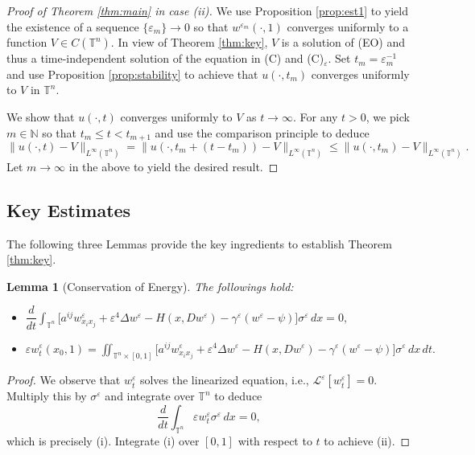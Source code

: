 \documentclass[12pt,reqno]{amsart}
\theoremstyle{plain}
\newtheorem{lem}[thm]{Lemma}
\theoremstyle{remark}
\numberwithin{equation}{section}
\begin{document}
\begin{proof}[Proof of Theorem {\rm\ref{thm:main}} in case {\rm(ii)}]
We use Proposition \ref{prop:est1} to yield the existence of a sequence $\{{\varepsilon}_m\} \to 0$ so that $w^{{\varepsilon}_m}(\cdot,1)$ converges uniformly to a function $V\in C({\mathbb{T}}^n)$. In view of Theorem \ref{thm:key}, $V$ is a solution of (EO) and thus a time-independent solution of the equation in (C) and (C)$_{\varepsilon}$. Set $t_m={\varepsilon}_m^{-1}$ and use Proposition \ref{prop:stability} to achieve that $u(\cdot,t_m)$ converges uniformly to $V$ in ${\mathbb{T}}^n$. 

We show that $u(\cdot,t)$ converges uniformly to $V$ as $t\to \infty$. 
For any $t>0$, we pick $m\in {\mathbb{N}}$ so that $t_m \leq t <t_{m+1}$ and
use the comparison principle to deduce 
$$
\|u(\cdot,t)-V\|_{L^\infty({\mathbb{T}}^n)} =\|u(\cdot,t_m+(t-t_m))-V\|_{L^\infty({\mathbb{T}}^n)}
\leq \|u(\cdot,t_m)-V\|_{L^\infty({\mathbb{T}}^n)}.
$$
Let $m\to \infty$ in the above to yield the desired result.
\end{proof}

\subsection{Key Estimates}

The following three Lemmas provide the key ingredients to establish
Theorem \ref{thm:key}.  

\begin{lem}[Conservation of Energy] \label{lem-1}
The followings hold:
\begin{itemize}
\item[(i)]
$\displaystyle \dfrac{d}{dt} \int_{{\mathbb{T}}^n} 
\big[a^{ij}w^{\varepsilon}_{x_ix_j}+{\varepsilon}^4{\Delta} w^{\varepsilon}-H(x,Dw^{\varepsilon})-{\gamma}^{\varepsilon}(w^{\varepsilon}-\psi)\big]{\sigma}^{\varepsilon} \,dx=0,$ \\
\item[(ii)]
$\displaystyle 
{\varepsilon} w^{\varepsilon}_t(x_0,1)=
\iint_{{\mathbb{T}}^n\times[0,1]} 
\big[a^{ij}w^{\varepsilon}_{x_ix_j}+{\varepsilon}^4{\Delta} w^{\varepsilon}
-H(x,Dw^{\varepsilon})-{\gamma}^{\varepsilon}(w^{\varepsilon}-\psi)\big]{\sigma}^{\varepsilon} \,dx\,dt.$
\end{itemize}
\end{lem}

\begin{proof}
We observe that $w^{\varepsilon}_t$ solves the linearized equation, 
i.e., ${\mathcal{L}}^{\varepsilon}[w^{\varepsilon}_t]=0$. 
Multiply this by ${\sigma}^{\varepsilon}$ and integrate over ${\mathbb{T}}^n$ to deduce 
$$
\frac{d}{dt} \int_{{\mathbb{T}}^n} {\varepsilon} w^{\varepsilon}_t {\sigma}^{\varepsilon}\,dx=0,
$$
which is precisely (i). Integrate (i) over $[0,1]$ with respect to $t$ to achieve (ii).
\end{proof}
\end{document}
